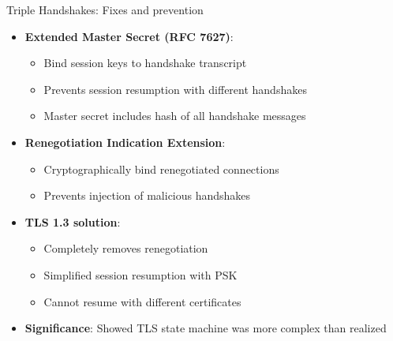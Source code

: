 \documentclass[aspectratio=169, lualatex, handout]{beamer}
\begin{document}
\begin{frame}{Triple Handshakes: Fixes and prevention}
	\begin{itemize}
		\item \textbf{Extended Master Secret (RFC 7627)}:
		      \begin{itemize}
			      \item Bind session keys to handshake transcript
			      \item Prevents session resumption with different handshakes
			      \item Master secret includes hash of all handshake messages
		      \end{itemize}
		\item \textbf{Renegotiation Indication Extension}:
		      \begin{itemize}
			      \item Cryptographically bind renegotiated connections
			      \item Prevents injection of malicious handshakes
		      \end{itemize}
		\item \textbf{TLS 1.3 solution}:
		      \begin{itemize}
			      \item Completely removes renegotiation
			      \item Simplified session resumption with PSK
			      \item Cannot resume with different certificates
		      \end{itemize}
		\item \textbf{Significance}: Showed TLS state machine was more complex than realized
	\end{itemize}
\end{frame}
\end{document}
